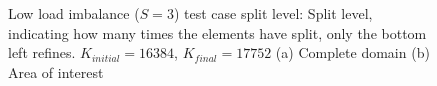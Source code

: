 \begin{figure}[H]
    \centering
    \hfill
    \caption{Low load imbalance (\(S = 3\)) test case split level: Split level, indicating how many times the elements have split, only the bottom left refines. \(K_{initial} = 16384\), \(K_{final} = 17752\) (a) Complete domain (b) Area of interest}\label{fig:load_imbalance_case_low_s}
\end{figure}

